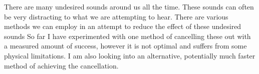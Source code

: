 There are many undesired sounds around us all the time.
These sounds can often be very distracting to what we are attempting to hear.
There are various methods we can employ in an attempt to reduce the effect of these undesired sounds
So far I have experimented with one method of cancelling these out with a measured amount of success, however it is not optimal and suffers from some physical limitations.
I am also looking into an alternative, potentially much faster method of achieving the cancellation.
